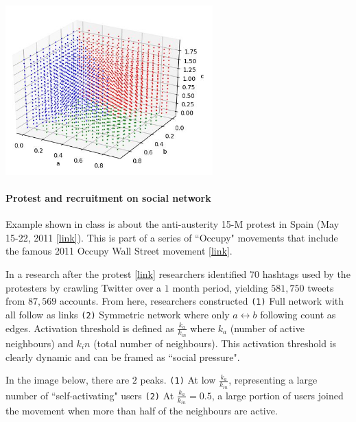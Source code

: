 {
\centering
\includegraphics[width=0.6\textwidth]{notes/img/n3_both_2.JPG} \par
}

\paragraph{Protest and recruitment on social network} Example shown in class is about the anti-austerity 15-M protest in Spain (May 15-22, 2011 \href{https://en.wikipedia.org/wiki/Anti-austerity_movement_in_Spain}{[link]}). This is part of a series of ``Occupy" movements that include the famous 2011 Occupy Wall Street movement \href{https://en.wikipedia.org/wiki/Occupy_Wall_Street}{[link]}. 

In a research after the protest \href{https://arxiv.org/ftp/arxiv/papers/1111/1111.5595.pdf}{[link]} researchers identified 70 hashtags used by the protesters by crawling Twitter over a $1$ month period, yielding $581,750$ tweets from $87,569$ accounts. From here, researchers constructed \texttt{(1)} Full network with all follow as links \texttt{(2)} Symmetric network where only $a \leftrightarrow b$ following count as edges. Activation threshold is defined as $\frac{k_a}{k_{in}}$ where $k_a$ (number of active neighbours) and $k_in$ (total number of neighbours). This activation threshold is clearly dynamic and can be framed as ``social pressure". 


In the image below, there are $2$ peaks. \texttt{(1)} At low $\frac{k_a}{k_{in}}$, representing a large number of ``self-activating" users \texttt{(2)} At $\frac{k_a}{k_{in}} = 0.5$, a large portion of users joined the movement when more than half of the neighbours are active.

